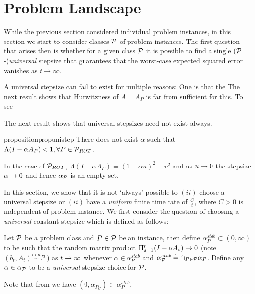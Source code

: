 \section{Problem Landscape}\label{sec:land}
While the previous section considered individual problem instances, in this section we start
to consider classes $\cP$ of problem instances.
The first question that arises then is whether for a given class $\cP$ it is possible to find a single
($\cP$-)\emph{universal} stepsize that guarantees that the worst-case expected squared error vanishes as $t\to\infty$.

A universal stepsize can fail to exist for multiple reasons: One is that the 
The next result shows that Hurwitzness of $A=A_P$ is far from sufficient for this.
To see

The next result shows that universal stepsizes need not exist always.
\begin{restatable}{proposition}{propunistep}\label{prop:unistep}
There does not exist $\alpha$ such that $\Lambda(I-\alpha A_P)<1, \forall P\in \P_{ROT}$. 
\end{restatable}
In the case of $\P_{ROT}$,  $\Lambda(I-\alpha A_P)=(1-\alpha u)^2+v^2$ and as $u\ra 0$ the stepsize $\alpha\ra 0$ and hence $\alpha_{\P}$ is an empty-set.


In this section, we show that it is not `always' possible to $(ii)$ choose a universal stepsize or $(ii)$ have a \emph{uniform} finite time rate of $\frac{C}{t}$, where $C>0$ is independent of problem instance.
We first consider the question of choosing a \emph{universal} constant stepsize which is defined as follows:
\begin{definition} Let $\P$ be a problem class and $P\in\P$ be an instance, then define $\alpha^{stab}_{P}\subset (0,\infty)$ to be such that the random matrix product $\Pi_{s=1}^t (I-\alpha A_s)\ra 0$ (note $(b_t,A_t)\overset{i.i.d}{\sim} P$ ) as $t\ra\infty$ whenever $\alpha\in \alpha^{stab}_P$ and $\alpha^{stab}_{\P}\eqdef\cap_{P\in \P}\alpha_{P}$. Define any $\alpha\in\alpha_{\P}$ to be a \emph{universal} stepsize choice for $\P$.
\end{definition}
Note that from  we have $(0,\alpha_{P_U})\subset \alpha^{stab}_{P}$. 

